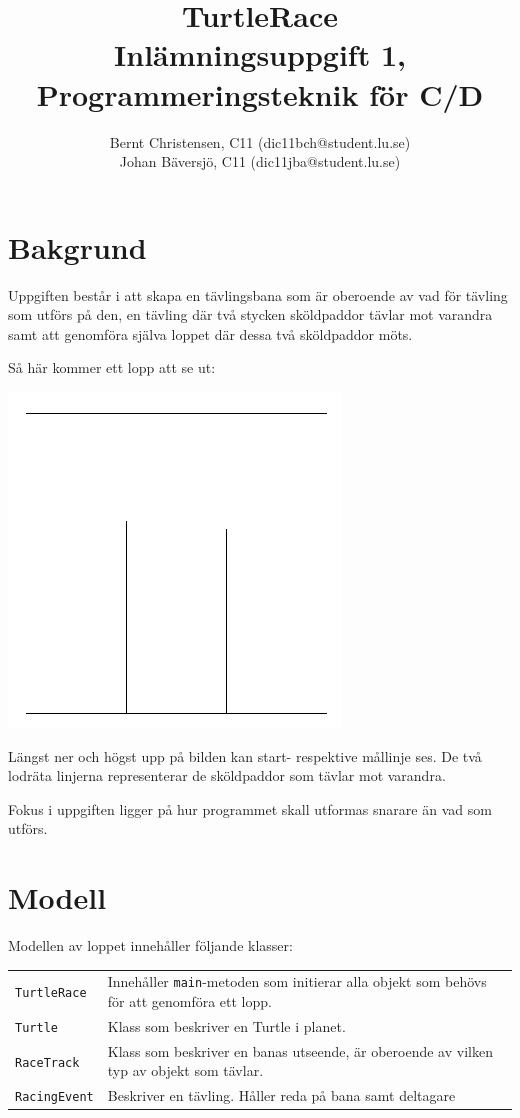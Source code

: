 \documentclass[a4paper]{article}
\title{TurtleRace \\
	Inlämningsuppgift 1, Programmeringsteknik för C/D}
\author{Bernt Christensen, C11 (dic11bch@student.lu.se)\\
Johan Bäversjö, C11 (dic11jba@student.lu.se)}
\newcommand{\code}[1]{\texttt{#1}} %
\begin{document}

\maketitle
\thispagestyle{empty}
\newpage
\setcounter{page}{1}
\section{Bakgrund}
Uppgiften består i att skapa en tävlingsbana som är oberoende av vad för tävling som utförs på den, en tävling där två stycken sköldpaddor tävlar mot varandra samt att genomföra själva loppet där dessa två sköldpaddor möts.

Så här kommer ett lopp att se ut:
\begin{center}
\includegraphics[scale=0.29]{turtle_race.png}
\end{center}
Längst ner och högst upp på bilden kan start- respektive mållinje ses. De två lodräta linjerna representerar de sköldpaddor som tävlar mot varandra.

Fokus i uppgiften ligger på hur programmet skall utformas snarare än vad som utförs. 

\section{Modell}
Modellen av loppet innehåller följande klasser:


\begin{tabular}{lp{8cm}}
\code{TurtleRace} & Innehåller \code{main}-metoden som initierar alla objekt som behövs för att genomföra ett lopp. \\
\code{Turtle} & Klass som beskriver en Turtle i planet. \\
\code{RaceTrack} & Klass som beskriver en banas utseende, är oberoende av vilken typ av objekt som tävlar. \\
\code{RacingEvent} & Beskriver en tävling. Håller reda på bana samt deltagare \\

\end{tabular}
\end{document}
